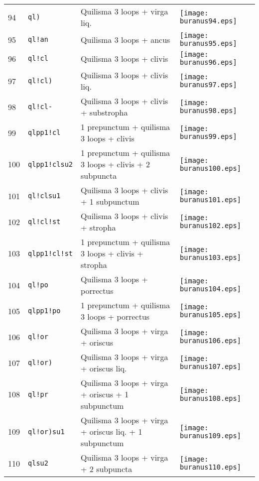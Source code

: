 \documentclass{scrarticle}
\begin{document}
\begin{longtable}{l|l|l|l}
94 & \texttt{ql)} & Quilisma 3 loops + virga liq. & \texttt{[image: buranus94.eps]} \\
95 & \texttt{ql!an} & Quilisma 3 loops + ancus & \texttt{[image: buranus95.eps]} \\
96 & \texttt{ql!cl} & Quilisma 3 loops + clivis & \texttt{[image: buranus96.eps]} \\
97 & \texttt{ql!cl)} & Quilisma 3 loops + clivis liq. & \texttt{[image: buranus97.eps]} \\
98 & \texttt{ql!cl-} & Quilisma 3 loops + clivis + substropha & \texttt{[image: buranus98.eps]} \\
99 & \texttt{qlpp1!cl} & 1 prepunctum + quilisma 3 loops + clivis & \texttt{[image: buranus99.eps]} \\
100 & \texttt{qlpp1!clsu2} & 1 prepunctum + quilisma 3 loops + clivis + 2 subpuncta & \texttt{[image: buranus100.eps]} \\
101 & \texttt{ql!clsu1} & Quilisma 3 loops + clivis + 1 subpunctum & \texttt{[image: buranus101.eps]} \\
102 & \texttt{ql!cl!st} & Quilisma 3 loops + clivis + stropha & \texttt{[image: buranus102.eps]} \\
103 & \texttt{qlpp1!cl!st} & 1 prepunctum + quilisma 3 loops + clivis + stropha & \texttt{[image: buranus103.eps]} \\
104 & \texttt{ql!po} & Quilisma 3 loops + porrectus & \texttt{[image: buranus104.eps]} \\
105 & \texttt{qlpp1!po} & 1 prepunctum + quilisma 3 loops + porrectus & \texttt{[image: buranus105.eps]} \\
106 & \texttt{ql!or} & Quilisma 3 loops + virga + oriscus & \texttt{[image: buranus106.eps]} \\
107 & \texttt{ql!or)} & Quilisma 3 loops + virga + oriscus liq. & \texttt{[image: buranus107.eps]} \\
108 & \texttt{ql!pr} & Quilisma 3 loops + virga + oriscus + 1 subpunctum & \texttt{[image: buranus108.eps]} \\
109 & \texttt{ql!or)su1} & Quilisma 3 loops + virga + oriscus liq. + 1 subpunctum & \texttt{[image: buranus109.eps]} \\
110 & \texttt{qlsu2} & Quilisma 3 loops + virga + 2 subpuncta & \texttt{[image: buranus110.eps]} \\

\end{longtable}
\end{document}
